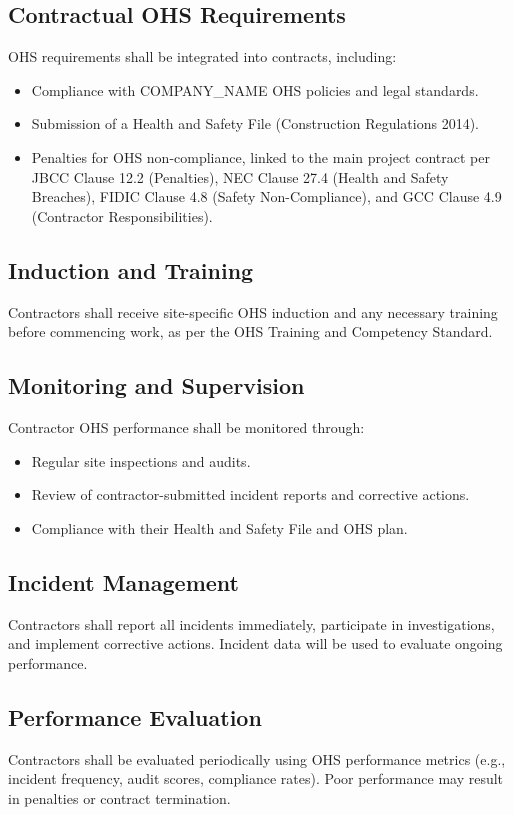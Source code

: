 \documentclass[12pt]{article}
\begin{document}
\subsection{Contractual OHS Requirements}
OHS requirements shall be integrated into contracts, including:
\begin{itemize}
    \item Compliance with {{COMPANY_NAME}} OHS policies and legal standards.
    \item Submission of a Health and Safety File (Construction Regulations 2014).
    \item Penalties for OHS non-compliance, linked to the main project contract per JBCC Clause 12.2 (Penalties), NEC Clause 27.4 (Health and Safety Breaches), FIDIC Clause 4.8 (Safety Non-Compliance), and GCC Clause 4.9 (Contractor Responsibilities).
\end{itemize}

\subsection{Induction and Training}
Contractors shall receive site-specific OHS induction and any necessary training before commencing work, as per the OHS Training and Competency Standard.

\subsection{Monitoring and Supervision}
Contractor OHS performance shall be monitored through:
\begin{itemize}
    \item Regular site inspections and audits.
    \item Review of contractor-submitted incident reports and corrective actions.
    \item Compliance with their Health and Safety File and OHS plan.
\end{itemize}

\subsection{Incident Management}
Contractors shall report all incidents immediately, participate in investigations, and implement corrective actions. Incident data will be used to evaluate ongoing performance.

\subsection{Performance Evaluation}
Contractors shall be evaluated periodically using OHS performance metrics (e.g., incident frequency, audit scores, compliance rates). Poor performance may result in penalties or contract termination.
\end{document}
